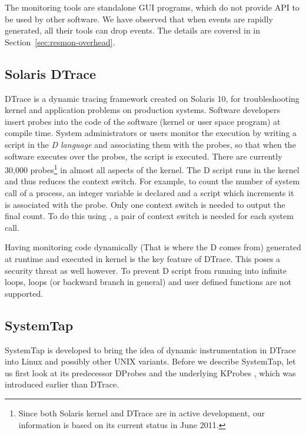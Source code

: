 The monitoring tools are standalone GUI programs, which do not
provide API to be used by other software.
We have observed that when events are rapidly generated, all their tools
can drop events.
The details are covered in in Section~\ref{sec:resmon-overhead}.

\subsection{Solaris DTrace}
\label{sec:dtrace}

DTrace\cite{cantrill2004dynamic} is a dynamic tracing framework
created on Solaris 10, for troubleshooting kernel and application problems
on production systems.
Software developers insert probes into the code of the software
(kernel or user space program) at compile time.
System administrators or users monitor the execution by writing
a script in the {\em D language} and associating them with the probes,
so that when the software executes over the probes, the script is executed.
There are currently 30,000  probes\footnote{
Since both Solaris kernel and DTrace are in active development,
our information is based on its current status in June 2011.}
in almost all aspects of the kernel.
The D script runs in the kernel and thus reduces the context switch.
For example, to count the number of  system call of a process,
an integer variable is declared and a script which increments it
is associated with the  probe.
Only one context switch is needed to output the final count.
To do this using , a pair of context switch is
needed for each  system call.

Having monitoring code dynamically (That is where the D comes from)
generated at runtime and executed in kernel is the key feature of
DTrace.
This poses a security threat as well however.
To prevent D script from running into infinite loops,
loops (or backward branch in general) and user defined functions
are not supported.

\subsection{SystemTap}
\label{sec:systemtap}

SystemTap \cite{prasad2005systemtap} is developed to bring the idea of dynamic instrumentation
in DTrace into Linux and possibly other UNIX variants.
Before we describe SystemTap, let us first look at its predecessor
DProbes \cite{moore2001dprobes} and the underlying KProbes \cite{mavinakayanahalli2006kprobes},
which was introduced earlier than DTrace.

